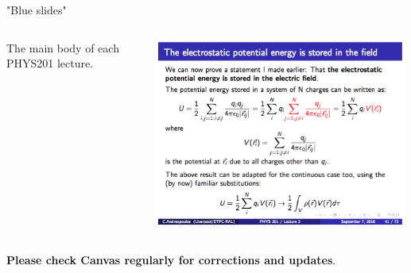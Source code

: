 \begin{frame}{"Blue slides"}

\begin{columns}
  \begin{column}{0.30\textwidth}
   \begin{center}
        The main body of each PHYS201 lecture.\\
   \end{center}
  \end{column}
  \begin{column}{0.70\textwidth}
   \begin{center}
     \includegraphics[width=0.99\textwidth]{./images/example_slides/main.png}\\
   \end{center}
  \end{column}
\end{columns}

\vspace{0.2cm}

\begin{center}
 {\bf Please check Canvas regularly for corrections and updates}.\\
\end{center}

\end{frame}

%
%
%

